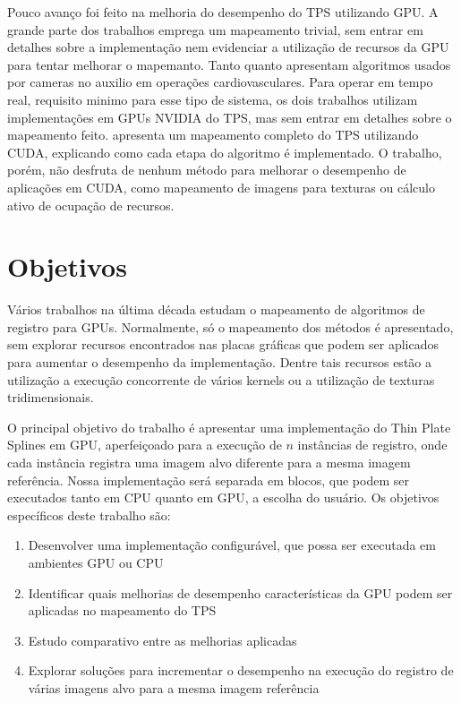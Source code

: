   Pouco avanço foi feito na melhoria do desempenho do TPS utilizando GPU. A
grande parte dos trabalhos emprega um mapeamento trivial, sem entrar em detalhes
sobre a implementação nem evidenciar a utilização de recursos da GPU para tentar
melhorar o mapemanto. Tanto \cite{richa2011towards} quanto
\cite{schoob2013stereoscopic} apresentam algoritmos usados por cameras no
auxilio em operações cardiovasculares. Para operar em tempo real, requisito
minimo para esse tipo de sistema, os dois trabalhos utilizam implementações
em GPUs NVIDIA do TPS, mas sem entrar em detalhes sobre o mapeamento feito.
\cite{luo2014gpu} apresenta um mapeamento completo do TPS utilizando CUDA,
explicando como cada etapa do algoritmo é implementado. O trabalho, porém, não
desfruta de nenhum método para melhorar o desempenho de aplicações em CUDA,
como mapeamento de imagens para texturas ou cálculo ativo de ocupação de
recursos.

\section{Objetivos}

  Vários trabalhos na última década estudam o mapeamento de algoritmos de
registro para GPUs. Normalmente, só o mapeamento dos métodos é apresentado, sem
explorar recursos encontrados nas placas gráficas que podem ser aplicados para
aumentar o desempenho da implementação. Dentre tais recursos estão a utilização
a execução concorrente de vários kernels ou a utilização de texturas
tridimensionais.

  O principal objetivo do trabalho é apresentar uma implementação do Thin Plate
Splines em GPU, aperfeiçoado para a execução de $n$ instâncias de registro, onde
cada instância registra uma imagem alvo diferente para a mesma imagem referência.
Nossa implementação será separada em blocos, que podem ser executados tanto em
CPU quanto em GPU, a escolha do usuário. Os objetivos específicos deste
trabalho são:

\begin{enumerate}
  \item Desenvolver uma implementação configurável, que possa ser executada
  em ambientes GPU ou CPU
	\item Identificar quais melhorias de desempenho características da GPU podem
        ser aplicadas no mapeamento do TPS
  \item Estudo comparativo entre as melhorias aplicadas
  \item Explorar soluções para incrementar o desempenho na execução do registro
  de várias imagens alvo para a mesma imagem referência
\end{enumerate}

